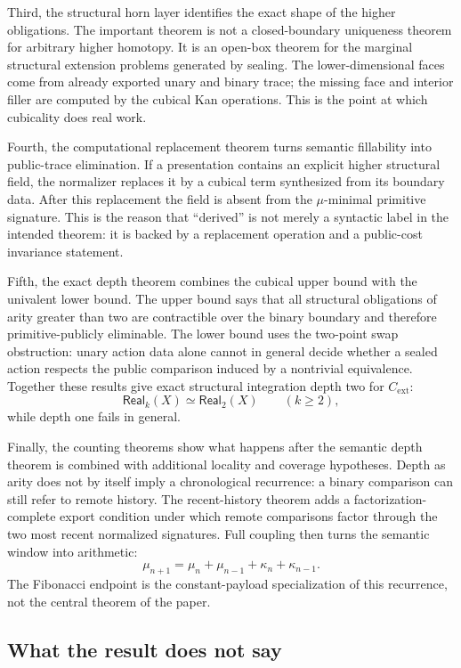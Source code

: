 \documentclass{lmcs}
\begin{document}
Third, the structural horn layer identifies the exact shape of the higher obligations.  The
important theorem is not a closed-boundary uniqueness theorem for arbitrary higher homotopy.
It is an open-box theorem for the marginal structural extension problems generated by sealing.
The lower-dimensional faces come from already exported unary and binary trace; the missing
face and interior filler are computed by the cubical Kan operations.  This is the point at
which cubicality does real work.

Fourth, the computational replacement theorem turns semantic fillability into public-trace
elimination.  If a presentation contains an explicit higher structural field, the normalizer
replaces it by a cubical term synthesized from its boundary data.  After this replacement the
field is absent from the \(\mu\)-minimal primitive signature.  This is the reason that
``derived'' is not merely a syntactic label in the intended theorem: it is backed by a
replacement operation and a public-cost invariance statement.

Fifth, the exact depth theorem combines the cubical upper bound with the univalent lower
bound.  The upper bound says that all structural obligations of arity greater than two are
contractible over the binary boundary and therefore primitive-publicly eliminable.  The lower
bound uses the two-point swap obstruction: unary action data alone cannot in general decide
whether a sealed action respects the public comparison induced by a nontrivial equivalence.
Together these results give exact structural integration depth two for \(C_{\mathrm{ext}}\):
\[
  \mathsf{Real}_k(X) \simeq \mathsf{Real}_2(X)
  \qquad (k \geq 2),
\]
while depth one fails in general.

Finally, the counting theorems show what happens after the semantic depth theorem is combined
with additional locality and coverage hypotheses.  Depth as arity does not by itself imply a
chronological recurrence: a binary comparison can still refer to remote history.  The
recent-history theorem adds a factorization-complete export condition under which remote
comparisons factor through the two most recent normalized signatures.  Full coupling then
turns the semantic window into arithmetic:
\[
  \mu_{n+1}
  =
  \mu_n + \mu_{n-1} + \kappa_n + \kappa_{n-1}.
\]
The Fibonacci endpoint is the constant-payload specialization of this recurrence, not the
central theorem of the paper.

\subsection{What the result does not say}
\label{subsec:conclusion-nonclaims}
\end{document}
